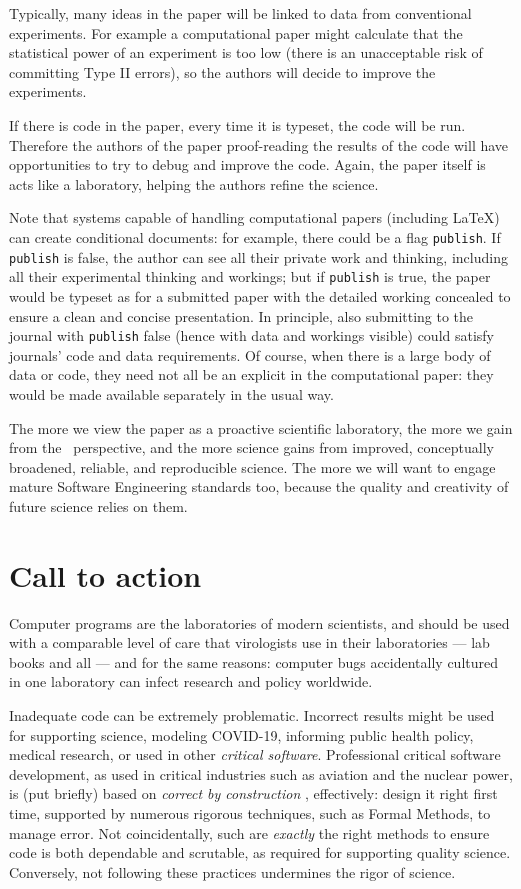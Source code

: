 \documentclass{comjnl}
\begin{document}
Typically, many ideas in the paper will be linked to data from conventional experiments. For example a computational paper might calculate that the statistical power of an experiment is too low (there is an unacceptable risk of committing Type II errors), so the authors will decide to improve the experiments. 

If there is code in the paper, every time it is typeset, the code will be run. Therefore the authors of the paper proof-reading the results of the code will have opportunities to try to debug and improve the code. Again, the paper itself is acts like a laboratory, helping the authors refine the science.

Note that systems capable of handling computational papers (including \LaTeX) can create conditional documents: for example, there could be a flag \texttt{publish}. If \texttt{publish} is false, the author can see all their private work and thinking, including all their experimental thinking and workings; but if \texttt{publish} is true, the paper would be typeset as for a submitted paper with the detailed working concealed to ensure a clean and concise presentation. In principle, also submitting to the journal with \texttt{publish} false (hence with data and workings visible) could satisfy journals' code and data requirements. Of course, when there is a large body of data or code, they need not all be an explicit in the computational paper: they would be made available separately in the usual way.

The more we view the paper as a proactive scientific laboratory, the more we gain from the \RAPstar\ perspective, and the more science gains from improved, conceptually broadened, reliable, and reproducible science. The more we will want to engage mature Software Engineering standards too, because the quality and creativity of future science relies on them.

\section{Call to action}\label{summary}
Computer programs are the laboratories of modern scientists, and should be used with a comparable level of care that virologists use in their laboratories --- lab books and all \cite{notebooks} --- and for the same reasons: computer bugs accidentally cultured in one laboratory can infect research and policy worldwide. 

Inadequate code can be extremely problematic. Incorrect results might be used for supporting science, modeling COVID-19, informing public health policy, medical research, or used in other \emph{critical software}. Professional critical software development, as used in critical industries such as aviation and the nuclear power, is (put briefly) based on \emph{correct by construction\/} \cite{cbc}, effectively: design it right first time, supported by numerous rigorous techniques, such as Formal Methods, to manage error. Not coincidentally, such are \emph{exactly\/} the right methods to ensure code is both dependable and scrutable, as required for supporting quality science. Conversely, not following these practices undermines the rigor of science.
\end{document}
